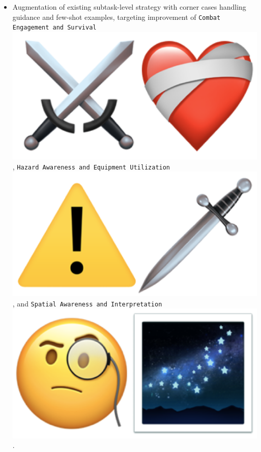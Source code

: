 \begin{flushleft}
\begin{itemize}
		\item Augmentation of existing subtask-level strategy with corner cases handling
			guidance and few-shot examples, targeting improvement of \texttt{Combat
			Engagement and Survival}
			\includegraphics[scale=0.05]{figs/emojis/mini_5.png}
			, \texttt{Hazard Awareness and Equipment Utilization}
			\includegraphics[scale=0.05]{figs/emojis/mini_3.png}
			, and \texttt{Spatial Awareness and Interpretation}
			\includegraphics[scale=0.05]{figs/emojis/mini_7.png}
			.


\end{itemize}
\end{flushleft}
